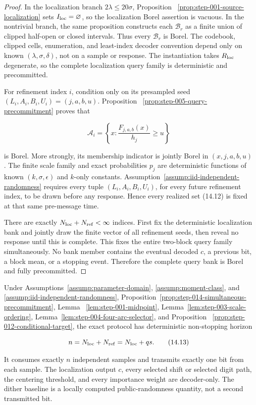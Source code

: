\begin{proof}
In the localization branch
\(2\lambda\leq20\sigma\), Proposition~
\ref{prop:step-001-source-localization} sets
\(I_{\rm loc}=\varnothing\), so the localization Borel assertion is
vacuous. In the nontrivial branch, the same proposition constructs each
\(\mathcal B_r\) as a finite union of clipped half-open or closed intervals.
Thus every \(\mathcal B_r\) is Borel. The codebook, clipped cells,
enumeration, and least-index decoder convention depend only on known
\((\lambda,\sigma,\delta)\), not on a sample or response. The instantiation takes \(R_{\rm loc}\) degenerate, so the complete localization
query family is deterministic and precommitted.

For refinement index \(i\), condition only on its presampled seed
\((L_i,A_i,B_i,U_i)=(j,a,b,u)\). Proposition~
\ref{prop:step-005-query-precommitment} proves that

\[
\mathcal A_i
=\left\{x:\frac{F_{j,a,b}(x)}{h_j}\geq u\right\}
\tag{14.12}
\]

is Borel. More strongly, its membership indicator is jointly Borel in
\((x,j,a,b,u)\). The finite scale family and exact probabilities \(p_j\)
are deterministic functions of known \((k,\sigma,\epsilon)\) and \(k\)-only constants. Assumption~\ref{assump:iid-independent-randomness}
requires every tuple \((L_i,A_i,B_i,U_i)\), for every future refinement
index, to be drawn before any response. Hence every realized set (14.12) is
fixed at that same pre-message time.

There are exactly \(N_{\rm loc}+N_{\rm ref}<\infty\) indices. First fix the
deterministic localization bank and jointly draw the finite vector of all
refinement seeds, then reveal no response until this is complete. This fixes
the entire two-block query family simultaneously. No bank member contains
the eventual decoded \(c\), a previous bit, a block mean, or a stopping
event. Therefore the complete query bank is Borel and fully precommitted.
\end{proof}

\begin{proposition}\label{prop:step-014-protocol-legality}
Under Assumptions~\ref{assump:parameter-domain},
\ref{assump:moment-class}, and
\ref{assump:iid-independent-randomness},
Proposition~\ref{prop:step-014-simultaneous-precommitment}, Lemma~
\ref{lem:step-001-midpoint}, Lemma~\ref{lem:step-003-scale-ordering},
Lemma~\ref{lem:step-004-four-arc-selector}, and Proposition~
\ref{prop:step-012-conditional-target}, the exact
protocol has deterministic non-stopping horizon

\[
n=N_{\rm loc}+N_{\rm ref}=N_{\rm loc}+qs.
\tag{14.13}
\]

It consumes exactly \(n\) independent samples and transmits exactly one bit
from each sample. The localization output \(c\), every selected shift or
selected digit path, the centering threshold, and every importance weight are
decoder-only. The dither baseline is a locally computed public-randomness
quantity, not a second transmitted bit.
\end{proposition}

